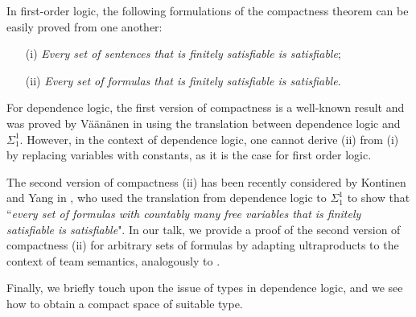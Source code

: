 \documentclass[bsl,meeting]{asl}
\newcommand{\NP}{}
\begin{document}
\thispagestyle{empty}


\NP  
{}
%


In first-order logic, the following formulations of the compactness theorem can be easily proved from one another:
\begin{itemize}
    \item[(i)] \textit{Every set of sentences that is finitely satisfiable is satisfiable};
    \item[(ii)] \textit{Every set of formulas that is finitely satisfiable is satisfiable}.
\end{itemize}

\noindent  For dependence logic, the first version of compactness is a well-known result and was proved by V\"a\"an\"anen in \cite{cite1} using the translation between dependence logic and $\Sigma_1^1$. However, in the context of dependence logic, one cannot derive (ii) from (i) by replacing variables with constants, as it is the case for first order logic. 

The second version of compactness (ii) has been recently considered by Kontinen and Yang in \cite{cite3}, who used the translation from dependence logic to $\Sigma_1^1$ to show that ``\textit{every set of formulas with countably many free variables that is finitely satisfiable is satisfiable}". In our talk, we provide a proof of the second version of compactness (ii) for arbitrary sets of formulas by adapting ultraproducts to the context of team semantics, analogously to \cite{cite4}. 

Finally, we briefly touch upon the issue of types in dependence logic, and we see how to obtain a compact space of suitable type.
\end{document}
